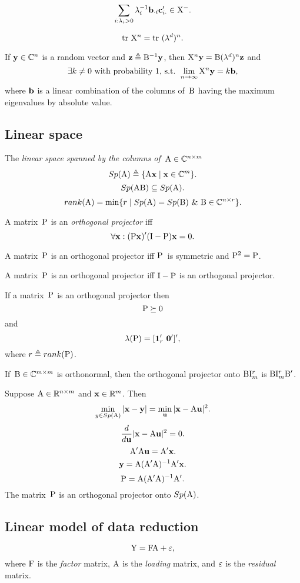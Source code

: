 \documentclass[10pt,a4paper]{article}
\theoremstyle{plain} \newtheorem{Lem}{Lemma}
\begin{document}
$$ \sum_{i:\lambda_i > 0} \lambda_i^{-1} \mathbf b_{\cdot i} \mathbf c_{i \cdot}' \in \mathrm X^-. $$

$$ \mathrm {tr} \  \mathrm X^n = \mathrm {tr} \  (\mathbf \lambda^d)^n. $$

If $\mathbf y \in \mathbb C^n$ is a random vector and $\mathbf z \triangleq \mathrm B^{-1} \mathbf y$, then $\mathrm X^n \mathbf y = \mathrm B (\mathbf \lambda^d)^n \mathbf z$ and
$$ \exists k \ne 0 \text{ with probability 1, s.t. } \lim_{n \to \infty} \mathrm X^n \mathbf y = k \mathbf b, $$
where $\mathbf b$ is a linear combination of the columns of~$\mathrm B$ having the maximum eigenvalues by absolute value.


\subsection{Linear space}

The {\em linear space spanned by the columns of~$\mathrm A \in \mathbb C^{n \times m}$}
$$ Sp(\mathrm A) \triangleq \{\mathrm A \mathbf x \mid \mathbf x \in \mathbb C^m\}. $$
$$ Sp(\mathrm A \mathrm B) \subseteq Sp(\mathrm A). $$
$$ rank(\mathrm A) = \min \{r \mid Sp(\mathrm A) = Sp(\mathrm B) \ \& \  \mathrm B \in \mathbb C^{n \times r} \}. $$

A matrix~$\mathrm P$ is an {\em orthogonal projector} iff
$$ \forall \mathbf x : (\mathrm P \mathbf x)' (\mathrm I - \mathrm P) \mathbf x = 0. $$

A matrix~$\mathrm P$ is an orthogonal projector iff $\mathrm P$~is symmetric and $\mathrm P^2 = \mathrm P$.

A matrix~$\mathrm P$ is an orthogonal projector iff $\mathrm I - \mathrm P$ is an orthogonal projector.

If a matrix~$\mathrm P$ is an orthogonal projector
then
$$ \mathrm P \succeq 0 $$
and
$$ \mathbf \lambda(\mathrm P) = [\mathbf 1_r' \ \mathbf 0']', $$
where $r \triangleq rank(\mathrm P)$.

If~$\mathrm B \in \mathbb C^{m \times m}$ is orthonormal,
then the orthogonal projector onto $\mathrm B \mathrm I^r_m$ is $\mathrm B \mathrm I^r_m \mathrm B'$.

Suppose $\mathrm A \in \mathbb R^{n \times m}$ and $\mathbf x \in \mathbb R^m$.
Then
$$ \min_{y \in Sp(\mathrm A)} |\mathbf x - \mathbf y| = \min_{\mathbf u} |\mathbf x - \mathrm A \mathbf u|^2. $$
$$ \frac d {d \mathbf u} |\mathbf x - \mathrm A \mathbf u|^2 = 0. $$
$$ \mathrm A' \mathrm A \mathbf u = \mathrm A' \mathbf x. $$
$$ \mathbf y = \mathrm A (\mathrm A' \mathrm A)^{-1} \mathrm A' \mathbf x. $$
$$ \mathrm P = \mathrm A (\mathrm A' \mathrm A)^{-1} \mathrm A'. $$
The matrix~$\mathrm P$ is an orthogonal projector onto $Sp(\mathrm A)$.


\subsection {Linear model of data reduction}
$$ \mathrm Y = \mathrm F \mathrm A + \mathrm \varepsilon, $$
where $\mathrm F$ is the {\em factor} matrix,
$\mathrm A$ is the {\em loading} matrix,
and $\mathrm \varepsilon$ is the {\em residual} matrix.
\end{document}
